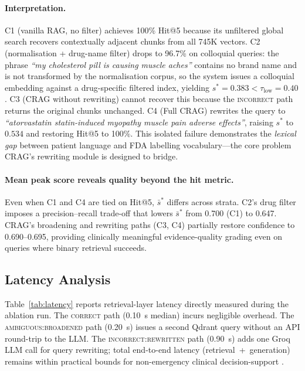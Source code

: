 \documentclass[10pt, twocolumn]{article}
\begin{document}
\paragraph{Interpretation.}
C1 (vanilla RAG, no filter) achieves 100\% Hit@5 because its
unfiltered global search recovers contextually adjacent chunks from all
745K vectors.  C2 (normalisation + drug-name filter) drops to 96.7\%
on colloquial queries: the phrase \textit{``my cholesterol pill is
causing muscle aches''} contains no brand name and is not transformed
by the normalisation corpus, so the system issues a colloquial embedding
against a drug-specific filtered index, yielding $s^{*} = 0.383 <
\tau_{\text{low}} = 0.40$.  C3 (CRAG without rewriting) cannot recover
this because the \textsc{incorrect} path returns the original chunks
unchanged.  C4 (Full CRAG) rewrites the query to
\textit{``atorvastatin statin-induced myopathy muscle pain adverse
effects''}, raising $s^{*}$ to $0.534$ and restoring Hit@5 to 100\%.
This isolated failure demonstrates the \emph{lexical gap} between
patient language and FDA labelling vocabulary—the core problem CRAG's
rewriting module is designed to bridge.

\paragraph{Mean peak score reveals quality beyond the hit metric.}
Even when C1 and C4 are tied on Hit@5, $\bar{s}^{*}$ differs across
strata.  C2's drug filter imposes a precision–recall trade-off that
lowers $\bar{s}^{*}$ from 0.700 (C1) to 0.647.  CRAG's broadening and
rewriting paths (C3, C4) partially restore confidence to 0.690--0.695,
providing clinically meaningful evidence-quality grading even on queries
where binary retrieval succeeds.

\subsection{Latency Analysis}

Table~\ref{tab:latency} reports retrieval-layer latency directly
measured during the ablation run.  The \textsc{correct} path
(0.10~s median) incurs negligible overhead.  The
\textsc{ambiguous:broadened} path (0.20~s) issues a second Qdrant
query without an API round-trip to the LLM.  The
\textsc{incorrect:rewritten} path (0.90~s) adds one Groq LLM call for
query rewriting; total end-to-end latency (retrieval~+~generation)
remains within practical bounds for non-emergency clinical
decision-support \cite{horsky2010computer}.
\end{document}
